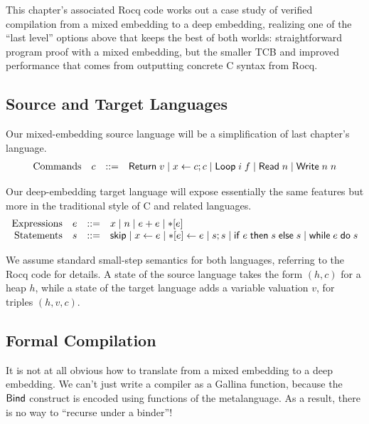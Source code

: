 \documentclass{amsbook}
\theoremstyle{definition}
\theoremstyle{remark}
\numberwithin{section}{chapter}
\numberwithin{equation}{chapter}
\begin{document}
This chapter's associated Rocq code works out a case study of verified compilation from a mixed embedding to a deep embedding, realizing one of the ``last level'' options above that keeps the best of both worlds: straightforward program proof with a mixed embedding, but the smaller TCB and improved performance that comes from outputting concrete C syntax from Rocq.

\subsection{Source and Target Languages}

Our mixed-embedding source language will be a simplification of last chapter's language.
$$\begin{array}{rrcl}
  \textrm{Commands} & c &::=& \mathsf{Return} \; v \mid x \leftarrow c; c \mid \mathsf{Loop} \; i \; f \mid \mathsf{Read} \; n \mid \mathsf{Write} \; n \; n
\end{array}$$

Our deep-embedding target language will expose essentially the same features but more in the traditional style of C and related languages.
$$\begin{array}{rrcl}
  \textrm{Expressions} & e &::=& x \mid n \mid e + e \mid {*}[e] \\
  \textrm{Statements} &s &::=& \mathsf{skip} \mid x \leftarrow e \mid {*}[e] \leftarrow e \mid s; s \mid \mathsf{if} \; e \; \mathsf{then} \; s \; \mathsf{else} \; s \mid \mathsf{while} \; e \; \mathsf{do} \; s
\end{array}$$

We assume standard small-step semantics for both languages, referring to the Rocq code for details.
A state of the source language takes the form $(h, c)$ for a heap $h$, while a state of the target language adds a variable valuation $v$, for triples $(h, v, c)$.

\subsection{Formal Compilation}

It is not at all obvious how to translate from a mixed embedding to a deep embedding.
We can't just write a compiler as a Gallina function, because the $\mathsf{Bind}$ construct is encoded using functions of the metalanguage.
As a result, there is no way to ``recurse under a binder''!

\newcommand{\dscomp}[3]{#1 \vdash #2 \hookrightarrow #3}
\end{document}
